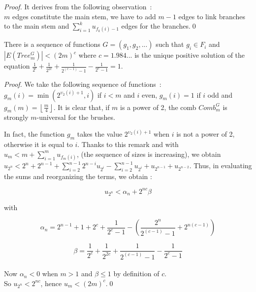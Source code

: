 \documentclass{llncs}
\begin{document}
\begin{proof}It derives from the following observation~:\\
\noindent $m$ edges constitute the main stem, we have to add $m -
1$ edges to link branches to the main stem and $\sum\limits_{i =
1}^k {u_{f_k \left( i \right) - 1} } $ edges for the branches.\qed
\end{proof}



\begin{theorem} There is a sequence of functions $G = \left( {g_1
,g_2 ,...} \right)$ such that $g_i \in F_i $ and $\left| {E\left( {Tree_m^G }
\right)} \right| < \left( {2m} \right)^c$ where $c = 1.984...$ is the unique
positive solution of the equation $\frac{1}{2^c} + \frac{1}{2^{2c}} +
\frac{1}{2^{\left( {c - 1} \right)} - 1} - \frac{1}{2^c - 1} = 1$.
\end{theorem}




\begin{proof}We take the following sequence of functions~:\\
$g_m \left( i \right) = \min \left( {2^{\upsilon _2 \left( i
\right) + 1},i} \right)$ if $i < m$ and $i$ even, $g_m \left( i
\right) = 1$ if $i$ odd and $g_m \left( m \right) = \left\lfloor
{\frac{m}{4}} \right\rfloor $. It is clear that, if $m$ is a power
of 2, the comb $Comb_m^G $ is strongly $m$-universal for the
brushes.

In fact, the function $g_m $ takes the value $2^{\upsilon _2 \left( i
\right) + 1}$ when $i$ is not a power of 2, otherwise it is equal to $i$.
Thanks to this remark and with $u_m < m + \sum\limits_{i = 1}^m {u_{f_m
\left( i \right)} } $, (the sequence of sizes is increasing), we obtain
$u_{2^n} < 2^n + 2^{n - 1} + \sum\limits_{i = 2}^{n - 1} {2^{n - i}u_{2^i} }
- \sum\limits_{i = 2}^{n - 1} {u_{2^i} } + u_{2^{n - 1}} + u_{2^{n - 2}} $.
Thus, in evaluating the sums and reorganizing the terms, we obtain :


\[
u_{2^n} < \alpha _n + 2^{nc}\beta
\]



\noindent
with


\[
\alpha _n = 2^{n - 1} + 1 + 2^c + \frac{1}{2^c - 1} - \left(
{\frac{2^n}{2^{\left( {c - 1} \right)} - 1} + 2^{n\left( {c - 1} \right)}}
\right)
\]




\[
\beta = \frac{1}{2^c} + \frac{1}{2^{2c}} + \frac{1}{2^{\left( {c - 1}
\right)} - 1} - \frac{1}{2^c - 1}
\]\\
Now $\alpha _n < 0$ when $m > 1$ and $\beta \le 1$ by definition
of $c.$\\ So $u_{2^n} < 2^{nc}$, hence $u_m < \left( {2m}
\right)^c$.\qed
\end{proof}
\end{document}
